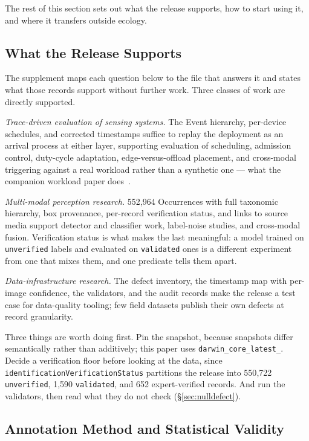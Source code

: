 \documentclass[sigconf]{acmart}
\begin{document}
The rest of this section sets out what the release supports, how to
start using it, and where it transfers outside ecology.

\subsection{What the Release Supports}

The supplement maps each question below to the file that answers it and
states what those records support without further work. Three classes
of work are directly supported.

\emph{Trace-driven evaluation of sensing systems.} The Event hierarchy,
per-device schedules, and corrected timestamps suffice to replay the
deployment as an arrival process at either layer, supporting evaluation
of scheduling, admission control, duty-cycle adaptation,
edge-versus-offload placement, and cross-modal triggering against a real
workload rather than a synthetic one --- what the companion workload
paper does~\cite{smartwilds_workload}.

\emph{Multi-modal perception research.} 552{,}964 Occurrences with full
taxonomic hierarchy, box provenance, per-record verification status, and
links to source media support detector and classifier work, label-noise
studies, and cross-modal fusion. Verification status is what makes the
last meaningful: a model trained on \texttt{unverified} labels and evaluated
on \texttt{validated} ones is a different experiment from one that mixes
them, and one predicate tells them apart.

\emph{Data-infrastructure research.} The defect inventory, the timestamp
map with per-image confidence, the validators, and the audit records
make the release a test case for data-quality tooling; few field
datasets publish their own defects at record granularity.



Three things are worth doing first. Pin the snapshot, because snapshots
differ semantically rather than additively; this paper uses
\texttt{darwin\_core\_\allowbreak latest\_}. Decide a verification floor before
looking at the data, since
\texttt{identification\allowbreak Verification\allowbreak Status} partitions the release into
550{,}722 \texttt{unverified}, 1{,}590 \texttt{validated}, and
652 expert-verified records. And run the validators, then read what
they do not check (\S\ref{sec:nulldefect}).

\subsection{Annotation Method and Statistical Validity}
\label{sec:validity}
\end{document}
